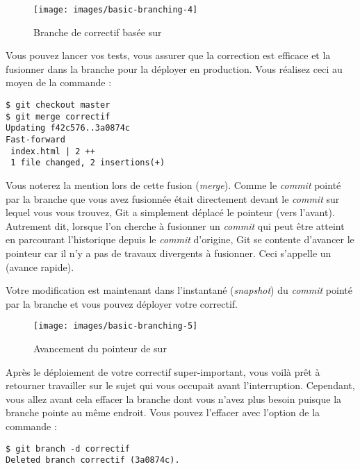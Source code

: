 \begin{figure}[H]
  \centering
  \texttt{[image: images/basic-branching-4]}
  \caption{Branche de correctif basée sur }
  \label{fig:git:basic-branching-4}
\end{figure}

Vous pouvez lancer vos tests, vous assurer que la correction est efficace et la fusionner dans la branche  pour la déployer en production.
Vous réalisez ceci au moyen de la commande :
\begin{Schunk}
\begin{Verbatim}
$ git checkout master
$ git merge correctif
Updating f42c576..3a0874c
Fast-forward
 index.html | 2 ++
 1 file changed, 2 insertions(+)
\end{Verbatim}
\end{Schunk}

Vous noterez la mention  lors de cette fusion (\emph{merge}).
Comme le \emph{commit}  pointé par la branche  que vous avez fusionnée était directement devant le \emph{commit}  sur lequel vous vous trouvez, Git a simplement déplacé le pointeur (vers l'avant).
Autrement dit, lorsque l'on cherche à fusionner un \emph{commit} qui peut être atteint en parcourant l'historique depuis le \emph{commit} d'origine, Git se contente d'avancer le pointeur car il n'y a pas de travaux divergents à fusionner. Ceci s'appelle un  (avance rapide).

Votre modification est maintenant dans l'instantané (\emph{snapshot}) du \emph{commit} pointé par la branche  et vous pouvez déployer votre correctif.

\begin{figure}[H]
  \centering
  \texttt{[image: images/basic-branching-5]}
  \caption{Avancement du pointeur de  sur }
  \label{fig:git:basic-branching-5}
\end{figure}

Après le déploiement de votre correctif super-important, vous voilà prêt à retourner travailler sur le sujet qui vous occupait avant l'interruption.
Cependant, vous allez avant cela effacer la branche  dont vous n'avez plus besoin puisque la branche  pointe au même endroit.
Vous pouvez l'effacer avec l'option  de la commande :

\begin{Schunk}
\begin{Verbatim}
$ git branch -d correctif
Deleted branch correctif (3a0874c).
\end{Verbatim}
\end{Schunk}


